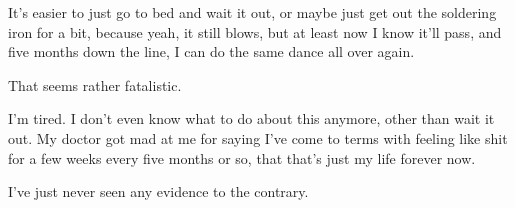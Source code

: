 It's easier to just go to bed and wait it out, or maybe just get out the soldering iron for a bit, because yeah, it still blows, but at least now I know it'll pass, and five months down the line, I can do the same dance all over again.

\begin{ally}
That seems rather fatalistic.
\end{ally}
I'm tired. I don't even know what to do about this anymore, other than wait it out. My doctor got mad at me for saying I've come to terms with feeling like shit for a few weeks every five months or so, that that's just my life forever now.

I've just never seen any evidence to the contrary.
\newpage
